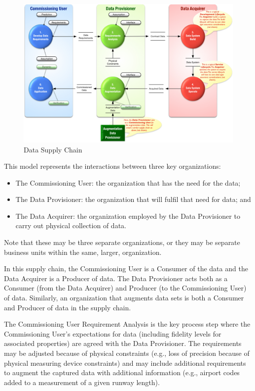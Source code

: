 \begin{figure}[htbp]
  \centering
  \includegraphics[width=\textwidth]{images/dataacquisitionlifecycleflat}
  \caption{Data Supply Chain}
  \label{fig:dataacquisitionlifecycle}
\end{figure}

This model represents the interactions between three key organizations:
\begin{itemize}
  \item The Commissioning User: the organization that has the need for the data;
  \item The Data Provisioner: the organization that will fulfil that need for data; and
  \item The Data Acquirer: the organization employed by the Data Provisioner to carry out physical collection of data.
\end{itemize}

Note that these may be three separate organizations, or they may be separate business units within the same, larger, organization.

In this supply chain, the Commissioning User is a Consumer of the data and the Data Acquirer is a Producer of data. The Data Provisioner acts both as a Consumer (from the Data Acquirer) and Producer (to the Commissioning User) of data. Similarly, an organization that augments data sets is both a Consumer and Producer of data in the supply chain.

The Commissioning User Requirement Analysis is the key process step where the Commissioning User's expectations for data (including fidelity levels for associated properties) are agreed with the Data Provisioner. The requirements may be adjusted because of physical constraints (e.g., loss of precision because of physical measuring device constraints) and may include additional requirements to augment the captured data with additional \gls{information} (e.g., airport codes added to a measurement of a given runway length).

